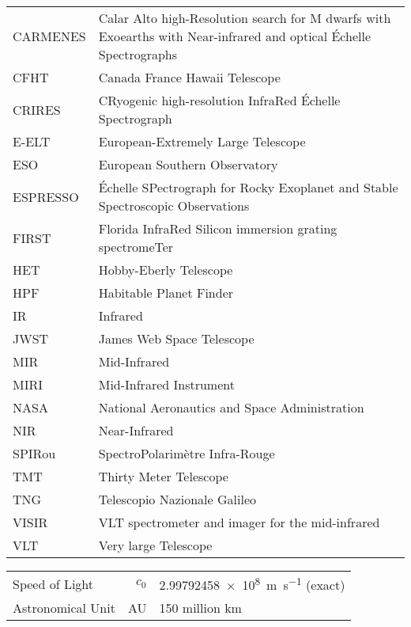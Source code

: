 \documentclass[fleqn]{fcup-thesis}
\begin{document}
\begin{preliminary}
\begin{abbreviations}
\begin{longtable}{ll}
				CARMENES & Calar Alto high-Resolution search for M dwarfs with Exoearths with Near-infrared and optical \'Echelle Spectrographs \\
				CFHT & Canada France Hawaii Telescope \\
				CRIRES & CRyogenic high-resolution InfraRed \'Echelle Spectrograph \\
				E-ELT & European-Extremely Large Telescope \\
				ESO & European Southern Observatory \\
				ESPRESSO & \'Echelle SPectrograph for Rocky Exoplanet and Stable Spectroscopic Observations\\
				FIRST & Florida InfraRed Silicon immersion grating spectromeTer \\
				HET & Hobby-Eberly Telescope \\
				HPF & Habitable Planet Finder \\
				IR & Infrared\\
				JWST & James Web Space Telescope \\
				MIR & Mid-Infrared \\
				MIRI & Mid-Infrared Instrument\\
				NASA & National Aeronautics and Space Administration \\
				NIR & Near-Infrared \\
				SPIRou & SpectroPolarim\`etre Infra-Rouge\\
				TMT & Thirty Meter Telescope\\
				TNG & Telescopio Nazionale Galileo \\
				VISIR &  VLT spectrometer and imager for the mid-infrared \\
				VLT & Very large Telescope \\

			\end{longtable}
		\end{abbreviations}

		\begin{constants}
			\begin{longtable}{lr@{${}={}$}l}

				 Speed of Light & $c_{0}$ & \SI{2.99792458e8}{\meter\per\second} (exact)\\
				 Astronomical Unit & AU & 150 million km\\
			\end{longtable}
		\end{constants}


\end{preliminary}
\end{document}
